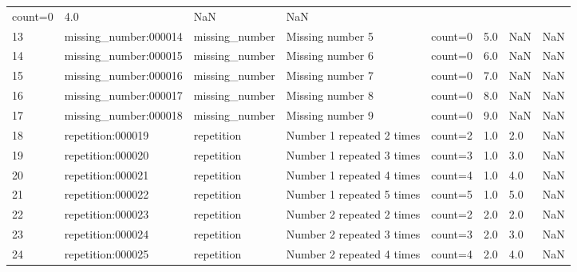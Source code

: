 \documentclass[
  11pt,
  a4paper,
  oneside,
  openany]{report}
\begin{document}
\begin{longtable}[]{@{}llllllll@{}}
count=0 & 4.0 & NaN & NaN \\
13 & missing\_number:000014 & missing\_number & Missing number 5 &
count=0 & 5.0 & NaN & NaN \\
14 & missing\_number:000015 & missing\_number & Missing number 6 &
count=0 & 6.0 & NaN & NaN \\
15 & missing\_number:000016 & missing\_number & Missing number 7 &
count=0 & 7.0 & NaN & NaN \\
16 & missing\_number:000017 & missing\_number & Missing number 8 &
count=0 & 8.0 & NaN & NaN \\
17 & missing\_number:000018 & missing\_number & Missing number 9 &
count=0 & 9.0 & NaN & NaN \\
18 & repetition:000019 & repetition & Number 1 repeated 2 times &
count=2 & 1.0 & 2.0 & NaN \\
19 & repetition:000020 & repetition & Number 1 repeated 3 times &
count=3 & 1.0 & 3.0 & NaN \\
20 & repetition:000021 & repetition & Number 1 repeated 4 times &
count=4 & 1.0 & 4.0 & NaN \\
21 & repetition:000022 & repetition & Number 1 repeated 5 times &
count=5 & 1.0 & 5.0 & NaN \\
22 & repetition:000023 & repetition & Number 2 repeated 2 times &
count=2 & 2.0 & 2.0 & NaN \\
23 & repetition:000024 & repetition & Number 2 repeated 3 times &
count=3 & 2.0 & 3.0 & NaN \\
24 & repetition:000025 & repetition & Number 2 repeated 4 times &
count=4 & 2.0 & 4.0 & NaN \\
\end{longtable}
\end{document}
